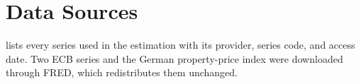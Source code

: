 \section{Data Sources}
\label{app:data-sources}

 lists every series used in the estimation with its provider, series code, and access date. Two ECB series and the German property-price index were downloaded through FRED, which redistributes them unchanged.


